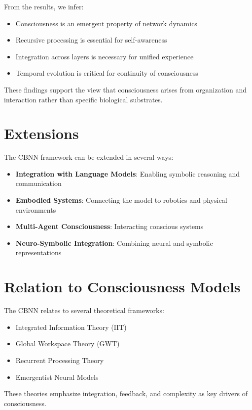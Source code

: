 \documentclass[12pt]{article}
\begin{document}
From the results, we infer:

\begin{itemize}
\item Consciousness is an emergent property of network dynamics
\item Recursive processing is essential for self-awareness
\item Integration across layers is necessary for unified experience
\item Temporal evolution is critical for continuity of consciousness
\end{itemize}

These findings support the view that consciousness arises from organization and interaction rather than specific biological substrates.

\section{Extensions}

The CBNN framework can be extended in several ways:

\begin{itemize}
\item \textbf{Integration with Language Models}: Enabling symbolic reasoning and communication
\item \textbf{Embodied Systems}: Connecting the model to robotics and physical environments
\item \textbf{Multi-Agent Consciousness}: Interacting conscious systems
\item \textbf{Neuro-Symbolic Integration}: Combining neural and symbolic representations
\end{itemize}

\section{Relation to Consciousness Models}

The CBNN relates to several theoretical frameworks:

\begin{itemize}
\item Integrated Information Theory (IIT)
\item Global Workspace Theory (GWT)
\item Recurrent Processing Theory
\item Emergentist Neural Models
\end{itemize}

These theories emphasize integration, feedback, and complexity as key drivers of consciousness.
\end{document}
